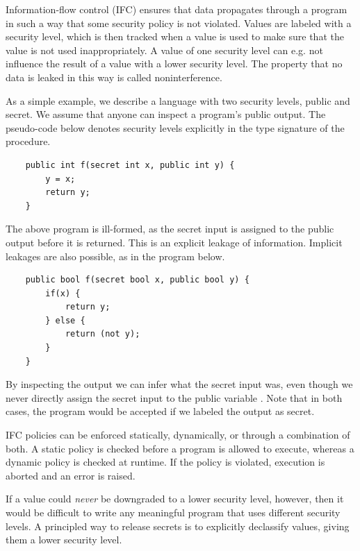 Information-flow control (IFC)\cite{DBLP:series/natosec/HedinS12} ensures that data propagates through a program in such a way that some security policy is
not violated. Values are labeled with a security level, which is then tracked when a value is used to make sure that the
value is not used inappropriately.
A value of one security level can e.g. not influence the result of a value with a lower security level. The property that no data is leaked
in this way is called noninterference.

As a simple example, we describe a language with two security levels, public and secret. We assume that anyone can inspect
a program's public output. The pseudo-code below denotes security levels explicitly in the type signature
of the procedure.

\begin{verbatim}
    public int f(secret int x, public int y) {
        y = x;
        return y;
    }
\end{verbatim}

The above program is ill-formed, as the secret input is assigned to the public output before it is returned. This is an
explicit leakage of information. Implicit leakages are also possible, as in the program below.

\begin{verbatim}
    public bool f(secret bool x, public bool y) {
        if(x) {
            return y;
        } else {
            return (not y);
        }
    }
\end{verbatim}

By inspecting the output we can infer what the secret input was, even though we never directly assign the secret input
to the public variable . Note that in both cases, the program would be accepted if we labeled the output as secret.

IFC policies can be enforced statically, dynamically, or through a combination of both. A static policy is checked before
a program is allowed to execute, whereas a dynamic policy is checked at runtime. If the policy is violated, execution
is aborted and an error is raised.

If a value could \textit{never} be downgraded to a lower security level, however, then it would be difficult to write any meaningful program that uses
different security levels. A principled way to release secrets is to explicitly declassify values, giving them a lower
security level.

